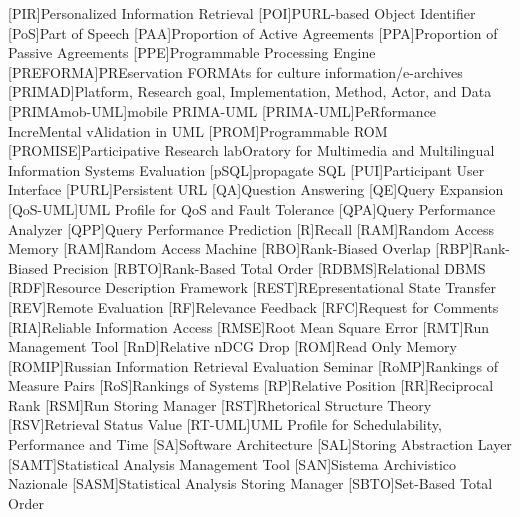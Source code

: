 [PIR]{Personalized Information Retrieval}
[POI]{\acs{PURL}-based Object Identifier}
[PoS]{Part of Speech}
[PAA]{Proportion of Active Agreements}
[PPA]{Proportion of Passive Agreements}
[PPE]{Programmable Processing Engine}
[PREFORMA]{PREservation FORMAts for culture information/e-archives}
[PRIMAD]{Platform, Research goal, Implementation, Method, Actor, and Data}
[PRIMAmob-UML]{mobile \acs{PRIMA-UML}}
[PRIMA-UML]{PeRformance IncreMental vAlidation in \acs{UML}}
[PROM]{Programmable \acs{ROM}}
[PROMISE]{Participative Research labOratory  for Multimedia and Multilingual Information Systems Evaluation}
[pSQL]{propagate \acs{SQL}}
[PUI]{Participant User Interface}
[PURL]{Persistent \acs{URL}}
[QA]{Question Answering}
[QE]{Query Expansion}
[QoS-UML]{\acs{UML} Profile for QoS and Fault Tolerance}
[QPA]{Query Performance Analyzer}
[QPP]{Query Performance Prediction}
[R]{Recall}
[RAM]{Random Access Memory}
[RAM]{Random Access Machine}
[RBO]{Rank-Biased Overlap}
[RBP]{Rank-Biased Precision}
[RBTO]{Rank-Based Total Order}
[RDBMS]{Relational \acs{DBMS}}
[RDF]{Resource Description Framework}
[REST]{REpresentational State Transfer}
[REV]{Remote Evaluation}
[RF]{Relevance Feedback}
[RFC]{Request for Comments}
[RIA]{Reliable Information Access}
[RMSE]{Root Mean Square Error}
[RMT]{Run Management Tool}
[RnD]{Relative nDCG Drop}
[ROM]{Read Only Memory}
[ROMIP]{Russian Information Retrieval Evaluation Seminar}
[RoMP]{Rankings of Measure Pairs}
[RoS]{Rankings of Systems}
[RP]{Relative Position}
[RR]{Reciprocal Rank}
[RSM]{Run Storing Manager}
[RST]{Rhetorical Structure Theory}
[RSV]{Retrieval Status Value}
[RT-UML]{\acs{UML} Profile for Schedulability, Performance and Time}
[SA]{Software Architecture}
[SAL]{Storing Abstraction Layer}
[SAMT]{Statistical Analysis Management Tool}
[SAN]{Sistema Archivistico Nazionale}
[SASM]{Statistical Analysis Storing Manager}
[SBTO]{Set-Based Total Order}
